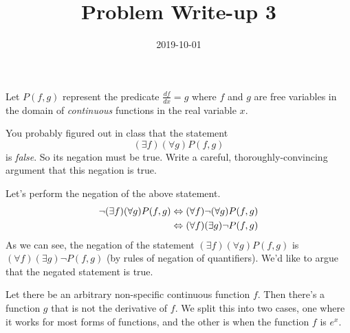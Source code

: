 \documentclass[a4paper,12pt]{article}
\title{Problem Write-up 3}
\date{2019-10-01}
\begin{document}
    \begin{problem}
        Let \(P(f,g)\) represent the predicate \(\frac{df}{dx} = g\) where \(f\) and \(g\) are free variables in the domain of \textit{continuous} functions in the real variable \(x\).

        You probably figured out in class that the statement \[(\exists f)(\forall g) P(f,g)\] is \textit{false}. So its negation must be true. Write a careful, thoroughly-convincing argument that this negation is true.

    \end{problem}
    \begin{answer}
        Let's perform the negation of the above statement.
        \begin{align*}
            \neg (\exists f)(\forall g) P(f,g) &\Leftrightarrow (\forall f) \neg (\forall g) P(f,g) \\
            &\Leftrightarrow (\forall f) (\exists g) \neg P(f,g)
        \end{align*}
        As we can see, the negation of the statement \((\exists f)(\forall g) P(f,g)\) is \((\forall f) (\exists g) \neg P(f,g)\) (by rules of negation of quantifiers). We'd like to argue that the negated statement is true.

        Let there be an arbitrary non-specific continuous function \(f\). Then there's a function \(g\) that is not the derivative of \(f\). We split this into two cases, one where it works for most forms of functions, and the other is when the function \(f\) is \(e^x\).

        
    \end{answer}
\end{document}
